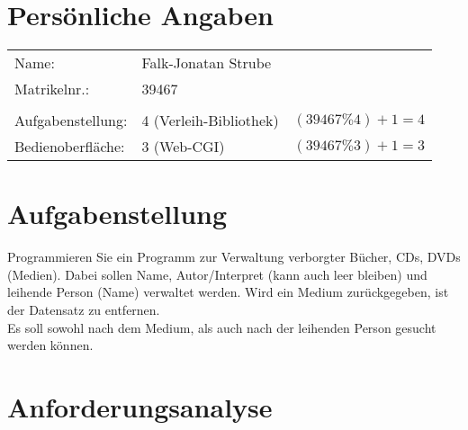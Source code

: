 

\DNotiz{}
\renewcommand{\workingdir}{../../}
\renewcommand{\Dokumentensignatur}{}
\renewcommand{\Autorformat}[1]{\textcolor{darkgray}{#1}}



\maketitle
\newpage
\tableofcontents
\newpage

\section{Persönliche Angaben}
\begin{tabular}{l l l}
Name: 					&Falk-Jonatan Strube\\
Matrikelnr.:		&39467\\
&&\\
Aufgabenstellung:	&4 (Verleih-Bibliothek)	&$( 39467 \% 4 ) + 1 = 4$\\
Bedienoberfläche:	&3 (Web-CGI)						&$( 39467 \% 3 ) + 1 = 3$\\
\end{tabular}

\section{Aufgabenstellung}
Programmieren Sie ein Programm zur Verwaltung verborgter Bücher, CDs, DVDs (Medien). Dabei sollen Name, Autor/Interpret (kann auch leer bleiben) und leihende Person (Name) verwaltet werden. Wird ein Medium zurückgegeben, ist der Datensatz zu entfernen.\\
Es soll sowohl nach dem Medium, als auch nach der leihenden Person gesucht werden können.

\section{Anforderungsanalyse}

